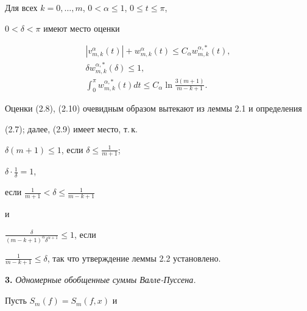 \begin{lems}


Для всех $k=0,\dotsc,m$, $0<\alpha \le 1$, $0\le t\le \pi$,


$0<\delta< \pi$ имеют место оценки


\begin{gather}


| v_{ m, k}^{\alpha}(t)|+ w_{m,k}^{\alpha}(t)


\le C_{\alpha} w_{m,k}^{\alpha,*}(t),\\


%


\delta w_{m,k}^{\alpha,*}(\delta)\le 1,\\


%


\int_0^\pi w_{m,k}^{\alpha,*}(t)dt \le C_{\alpha}


\ln \frac {3(m+1)}{m-k+1}.


\end{gather}


\end{lems}





Оценки (2.8), (2.10) очевидным образом вытекают из леммы 2.1 и определения


(2.7); далее, (2.9) имеет место, т.\,к.


$\delta (m{+}1)\le 1$, если $\delta\le \frac {1}{m+1}$;


$\delta\cdot \frac{1}{\delta}{=}1$, 


если $ \frac{1}{m+1}<\delta \le \frac{1}{m-k+1}$


и 


$\frac {\delta}{(m-k+1)^\alpha \delta^{\alpha +1}}\le 1$, если


$\frac {1}{m-k+1}\le \delta $, так что утверждение леммы 2.2 установлено.


\medskip





\addtocounter{section}{1}


\setcounter{equation}{0}


\setcounter{lems}{0}


\setcounter{thms}{0}








{\bf 3.} {\it Одномерные обобщенные суммы Валле-Пуссена.}


Пусть $S_m(f)=S_m(f,x)$ и


